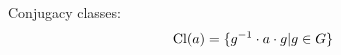 %
%    
%    
%
%
%    
%

\begin{frame}
    Conjugacy classes:
    \begin{align*}
        \operatorname{Cl}(a) & = \{g^{-1} \cdot a \cdot g | g \in G \}
    \end{align*}
\end{frame}

